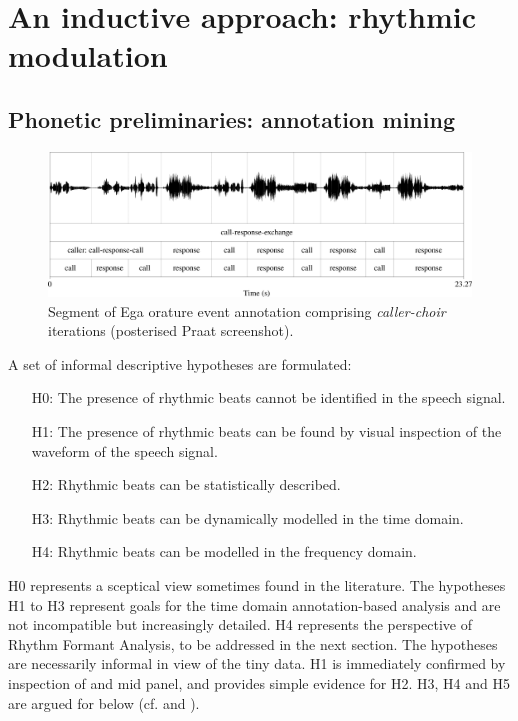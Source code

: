 \documentclass[output=paper,colorlinks,citecolor=brown]{langscibook}
\begin{document}

\section{An inductive approach: rhythmic modulation}

\subsection{Phonetic preliminaries: annotation mining}

\begin{figure}
\includegraphics[width=\textwidth]{gibbon_figure04.png}
\caption{\label{fig:fig04}Segment of Ega orature event annotation comprising \textit{caller-choir} iterations (posterised Praat screenshot).}
\end{figure}

A set of informal descriptive hypotheses are formulated:

\begin{itemize}
    \item[H0:] The presence of rhythmic beats cannot be identified in the speech signal.
    \item[H1:] The presence of rhythmic beats can be found by visual inspection of the waveform of the speech signal.
    \item[H2:] Rhythmic beats can be statistically described.
    \item[H3:] Rhythmic beats can be dynamically modelled in the time domain.
    \item[H4:] Rhythmic beats can be modelled in the frequency domain.
\end{itemize}

H0 represents a sceptical view sometimes found in the literature. The hypotheses H1 to H3 represent goals for the time domain annotation-based analysis and are not incompatible but increasingly detailed. H4 represents the perspective of Rhythm Formant Analysis, to be addressed in the next section. The hypotheses are necessarily informal in view of the tiny data. H1 is immediately confirmed by inspection of  and  mid panel, and  provides simple evidence for H2. H3, H4 and H5 are argued for below (cf.  and ).
\end{document}
